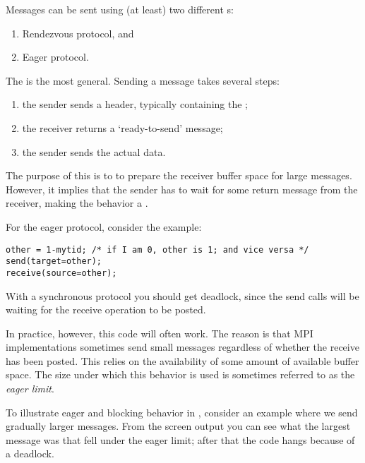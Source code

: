 Messages can be sent using (at least) two different
s:
\begin{enumerate}
\item Rendezvous protocol, and
\item Eager protocol.
\end{enumerate}
The  is the most general.
Sending a message takes several steps:
\begin{enumerate}
\item the sender sends a header,
  typically containing the ;
\item the receiver returns a `ready-to-send' message;
\item the sender sends the actual data.
\end{enumerate}
The purpose of this is to to prepare the receiver buffer space
for large messages. However, it implies that the sender has to
wait for some return message from the receiver,
making the behavior a .

For the eager protocol, consider the example:
\begin{lstlisting}
other = 1-mytid; /* if I am 0, other is 1; and vice versa */
send(target=other);
receive(source=other);
\end{lstlisting}
With a synchronous protocol you should get deadlock,
since the send calls will be waiting for the receive operation to be posted.

In practice, however, this code will often work. The reason is that
MPI implementations sometimes send small messages regardless of whether
the receive has been posted. This relies on the availability of
some amount of available buffer space. The size under which this behavior
is used is sometimes referred to as the \emph{eager limit}.

\begin{comment}
  The following code is guaranteed to block, since a \indexmpishow{MPI_Recv}
  always blocks:
  \cverbatimsnippet[examples/mpi/c/recvblock.c]{recvblock}
  On the other hand, if we put the send call before the receive,
  code may not block for small messages
  that fall under the eager limit.
\end{comment}

To illustrate eager and blocking behavior in ,
consider an example where we send
gradually larger messages. From the screen output you can see what
the largest message was that fell under the eager limit; after that the code
hangs because of a deadlock.
%
%
%

